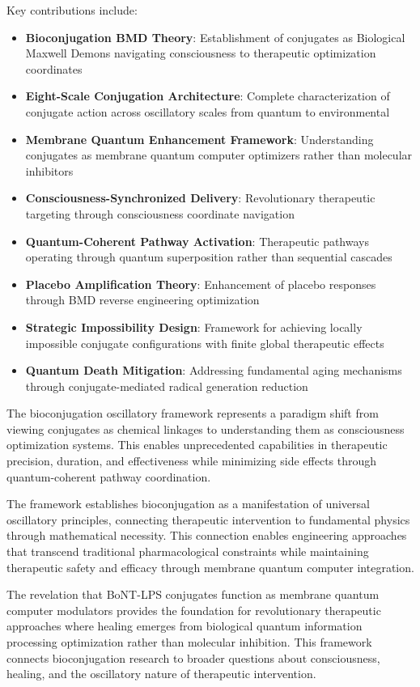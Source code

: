 \documentclass[12pt,a4paper]{article}
\begin{document}
Key contributions include:

\begin{itemize}
\item \textbf{Bioconjugation BMD Theory}: Establishment of conjugates as Biological Maxwell Demons navigating consciousness to therapeutic optimization coordinates
\item \textbf{Eight-Scale Conjugation Architecture}: Complete characterization of conjugate action across oscillatory scales from quantum to environmental
\item \textbf{Membrane Quantum Enhancement Framework}: Understanding conjugates as membrane quantum computer optimizers rather than molecular inhibitors
\item \textbf{Consciousness-Synchronized Delivery}: Revolutionary therapeutic targeting through consciousness coordinate navigation
\item \textbf{Quantum-Coherent Pathway Activation}: Therapeutic pathways operating through quantum superposition rather than sequential cascades
\item \textbf{Placebo Amplification Theory}: Enhancement of placebo responses through BMD reverse engineering optimization
\item \textbf{Strategic Impossibility Design}: Framework for achieving locally impossible conjugate configurations with finite global therapeutic effects
\item \textbf{Quantum Death Mitigation}: Addressing fundamental aging mechanisms through conjugate-mediated radical generation reduction
\end{itemize}

The bioconjugation oscillatory framework represents a paradigm shift from viewing conjugates as chemical linkages to understanding them as consciousness optimization systems. This enables unprecedented capabilities in therapeutic precision, duration, and effectiveness while minimizing side effects through quantum-coherent pathway coordination.

The framework establishes bioconjugation as a manifestation of universal oscillatory principles, connecting therapeutic intervention to fundamental physics through mathematical necessity. This connection enables engineering approaches that transcend traditional pharmacological constraints while maintaining therapeutic safety and efficacy through membrane quantum computer integration.

The revelation that BoNT-LPS conjugates function as membrane quantum computer modulators provides the foundation for revolutionary therapeutic approaches where healing emerges from biological quantum information processing optimization rather than molecular inhibition. This framework connects bioconjugation research to broader questions about consciousness, healing, and the oscillatory nature of therapeutic intervention.
\end{document}
